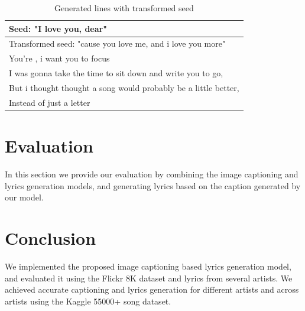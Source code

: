 \documentclass{article}
\begin{document}
\begin{table}[]
\centering
\label{tab:better-result}
\begin{tabular}{l}
\hline
Seed: "I love you, dear"                                        \\ \hline
Transformed seed: "cause you love me, and i love you more"      \\ \hline
You’re , i want you to focus                                    \\
I was gonna take the time to sit down and write you to go,      \\
But i thought thought a song would probably be a little better, \\
Instead of just a letter                                        \\ \hline
\end{tabular}
\caption{Generated lines with transformed seed}
\end{table}

\section{Evaluation}
\label{sec:4}

In this section we provide our evaluation by combining the image captioning and lyrics generation models, and generating lyrics based on the caption generated by our model. 

\section{Conclusion}
\label{sec:5}

We implemented the proposed image captioning based lyrics generation model, and evaluated it using the Flickr 8K dataset and lyrics from several artists. We achieved accurate captioning and lyrics generation for different artists and across artists using the Kaggle 55000+ song dataset.
\end{document}
